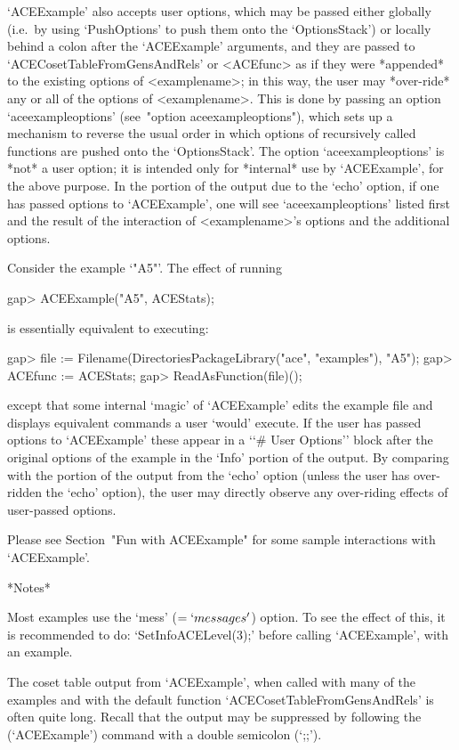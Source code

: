 `ACEExample' also accepts user options, which  may  be  passed  either
globally  (i.e.~by  using  `PushOptions'  to  push   them   onto   the
`OptionsStack') or locally  behind  a  colon  after  the  `ACEExample'
arguments, and they are passed  to  `ACECosetTableFromGensAndRels'  or
<ACEfunc> as if they  were  *appended*  to  the  existing  options  of
<examplename>; in this way, the user may *over-ride* any or all of the
options  of  <examplename>.  This  is  done  by  passing   an   option
`aceexampleoptions' (see~"option aceexampleoptions"), which sets up  a
mechanism to reverse the usual order in which options  of  recursively
called functions  are  pushed  onto  the  `OptionsStack'.  The  option
`aceexampleoptions' is *not* a user option; it is  intended  only  for
*internal* use by `ACEExample', for the above purpose. In the  portion
of the output due to the `echo' option, if one has passed  options  to
`ACEExample', one will see `aceexampleoptions' listed  first  and  the
result  of  the  interaction  of  <examplename>'s  options   and   the
additional options.

Consider the example `"A5"'. The effect of running

\beginexample
gap> ACEExample("A5", ACEStats);
\endexample

is essentially equivalent to executing:

\beginexample
gap> file := Filename(DirectoriesPackageLibrary("ace", "examples"), "A5");
gap> ACEfunc := ACEStats;
gap> ReadAsFunction(file)();
\endexample

except that  some  internal  \lq{}magic'  of  `ACEExample'  edits  the
example file and  displays  equivalent  commands  a  user  \lq{}would'
execute. If the user has passed options to `ACEExample'  these  appear
in a \lq{}`\# User Options'' block after the original options  of  the
example in the `Info' portion of the output.  By  comparing  with  the
portion of the output from the `echo'  option  (unless  the  user  has
over-ridden the `echo' option), the  user  may  directly  observe  any
over-riding effects of user-passed options.

Please see Section~"Fun with ACEExample" for some sample  interactions
with `ACEExample'.

*Notes*

Most examples use the `mess'  ($=  `messages'$)  option.  To  see  the
effect of this, it is recommended to do: `SetInfoACELevel(3);'  before
calling `ACEExample', with an example.

The coset table output from `ACEExample', when called with many of the
examples     and     with     the     default     {\ACE}      function
`ACECosetTableFromGensAndRels' is often quite long.  Recall  that  the
output may be suppressed by following the (`ACEExample') command  with
a double semicolon (`;;').

